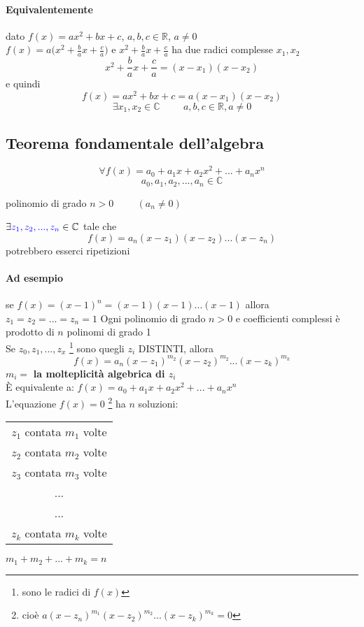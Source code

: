     \paragraph{Equivalentemente} dato $f(x)=ax^2+bx+c$, $a,b,c\in\mathbb{R}$, $a\neq 0 $\\
    $f(x)=a\Big( x^2+\frac{b}{a}x+\frac{c}{a}\Big)$ e $x^2+\frac{b}{a}x+\frac{c}{a}$ 
    ha due radici complesse $x_1, x_2$
    $$x^2+\frac{b}{a}x+\frac{c}{a}=(x-x_1)(x-x_2)$$
    e quindi 
    $$f(x)=ax^2+bx+c=a(x-x_1)(x-x_2)$$
    $$\exists x_1, x_2\in\mathbb{C}\hspace{1cm}a,b,c\in\mathbb{R}, a\neq 0$$
    \subsection{Teorema fondamentale dell'algebra}
    $$\forall f(x)=a_0+a_1x+a_2x^2+...+a_nx^n$$
    $$a_0, a_1,a_2,...,a_n\in\mathbb{C}$$
    \begin{center}
        polinomio di grado $n>0\hspace{1cm}(a_n\neq 0)$
    \end{center}
    $\exists {\color{blue}z_1, z_2,..., z_n} \in \mathbb{C}$ tale che 
    $$f(x)=a_n(x-z_1)(x-z_2)...(x-z_n)$$
    {\color{blue} potrebbero esserci ripetizioni}
    \paragraph{Ad esempio} se $f(x)=(x-1)^n=(x-1)(x-1)...(x-1)$ allora $z_1=z_2=...=z_n=1$
    {\color{red} Ogni polinomio di grado $n>0$ e coefficienti complessi è prodotto di $n$ 
    polinomi di grado 1}\\
    Se $z_0,z_1,...,z_x$ \footnote{sono le radici di $f(x)$} sono quegli $z_i$ DISTINTI, allora 
    $$f(x)=a_n(x-z_1)^{m_2}(x-z_2)^{m_2}...(x-z_k)^{m_k}$$
    {\color{red} $m_i=$ \textbf{la molteplicità algebrica di $z_i$}}\\
    È equivalente a: $f(x)=a_0+a_1x+a_2x^2+...+a_nx^n$\\
    L'equazione $f(x)=0$ \footnote{cioè $a(x-z_n)^{m_1}(x-z_2)^{m_2}...(x-z_k)^{m_k}=0$} 
    ha $n$ soluzioni:\\
    \begin{tabular}{c}
        $z_1$ contata $m_1$ volte\\
        $z_2$ contata $m_2$ volte\\
        $z_3$ contata $m_3$ volte\\
        ...\\
        ...\\
        $z_k$ contata $m_k$ volte\\
    \end{tabular} \hspace{1cm}
    {\color{red}$m_1+m_2+...+m_k=n$}
